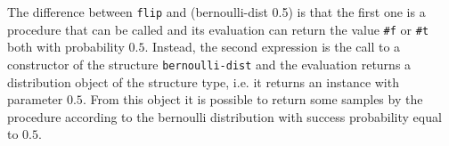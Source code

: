 The difference between \texttt{flip} and (bernoulli-dist 0.5) is that the first one is a procedure that can be called and its
evaluation can return the value \texttt{\#f} or \texttt{\#t} both with probability $0.5$.
Instead, the second expression is the call to a constructor of the structure \texttt{bernoulli-dist} and the evaluation returns
a distribution object of the structure type, i.e. it returns an instance with parameter $0.5$. From this object it is possible
to return some samples by the procedure according to the bernoulli distribution with success probability equal to $0.5$.
